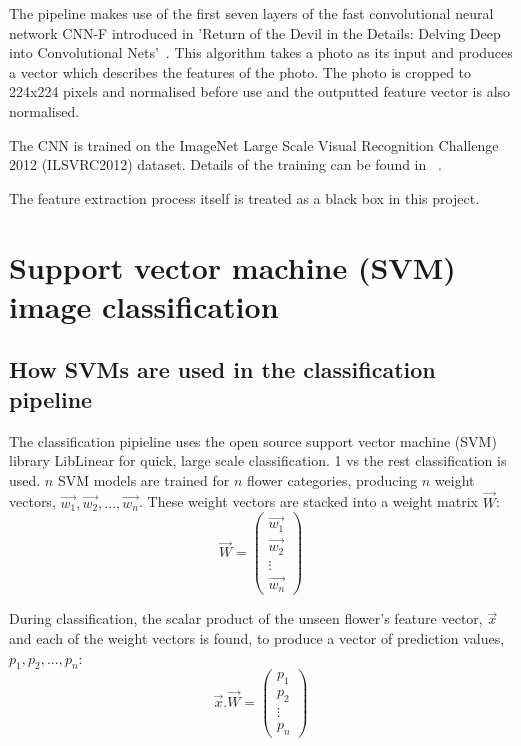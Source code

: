 \documentclass[11pt, a4paper]{report}
\begin{document}
The pipeline makes use of the first seven layers of the fast convolutional neural network CNN-F introduced in 'Return of the Devil in the Details:
Delving Deep into Convolutional Nets'~\cite{Chatfield14}. This algorithm takes a photo as its input and produces a vector which describes the features of the photo. The photo is cropped to 224x224 pixels and normalised before use and the outputted feature vector is also normalised.


The CNN is trained on the ImageNet Large Scale Visual Recognition Challenge 2012 (ILSVRC2012) dataset. Details of the training can be found in ~\cite{Chatfield14}.

The feature extraction process itself is treated as a black box in this project. 

 


\section{Support vector machine (SVM) image classification}

\subsection{How SVMs are used in the classification pipeline}

The classification pipieline uses the open source support vector machine (SVM) library LibLinear for quick, large scale classification. 1 vs the rest classification is used. $n$ SVM models are trained for $n$ flower categories, producing $n$ weight vectors, $\vec{w_{1}}, \vec{w_{2}}, ..., \vec{w_{n}}$. These weight vectors are stacked into a weight matrix $\vec{W}$:
$$
\vec{W} = 
\begin{pmatrix}
\vec{w_{1}}\\  
\vec{w_{2}}\\ 
\vdots \\ 
\vec{w_{n}}
\end{pmatrix}
$$



During classification, the scalar product of the unseen flower's feature vector, $\vec{x}$ and each of the weight vectors is found, to produce a vector of prediction values, $p_{1}, p_{2}, ...,  p_{n}$:
$$
\vec{x}.\vec{W} =
\begin{pmatrix}
p_{1}\\  
p_{2}\\ 
\vdots \\ 
p_{n}
\end{pmatrix}
$$
\end{document}
